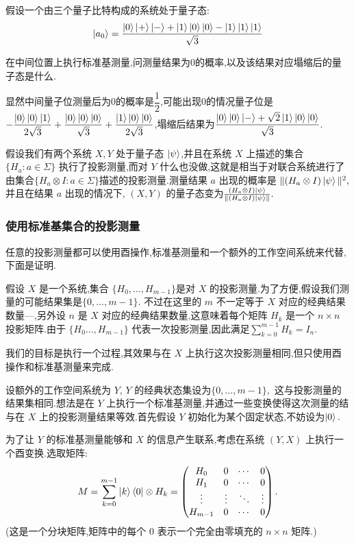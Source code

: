 \begin{example}
假设一个由三个量子比特构成的系统处于量子态:
$$
\ket{a_0}=\dfrac{\ket{0}\ket{+}\ket{-}+\ket{1}\ket{0}\ket{0}-\ket{1}\ket{1}\ket{1}}{\sqrt{3}}
$$

在中间位置上执行标准基测量,问测量结果为0的概率,以及该结果对应塌缩后的量子态是什么.

显然中间量子位测量后为0的概率是$\dfrac{1}{2}$,可能出现0的情况量子位是$-\dfrac{\ket{0}\ket{0}\ket{1}}{2\sqrt{3}}+\dfrac{\ket{0}\ket{0}\ket{0}}{\sqrt{3}}+\dfrac{\ket{1}\ket{0}\ket{0}}{2\sqrt{3}}$,塌缩后结果为$\dfrac{\ket{0}\ket{0}\ket{-}+\sqrt{2}\ket{1}\ket{0}\ket{0}}{\sqrt{3}}$.
\end{example}	
	
	
假设我们有两个系统 $X, Y$ 处于量子态 $\ket{\psi}$,并且在系统 $X$ 上描述的集合 $\{H_a : a \in \Sigma\}$ 执行了投影测量,而对 $Y$ 什么也没做,这就是相当于对联合系统进行了由集合$\{H_a \otimes I : a \in \Sigma\}$描述的投影测量.测量结果 $a$ 出现的概率是
$\|(H_a \otimes I) \ket{\psi}\|^2,$并且在结果 $a$ 出现的情况下, $(X, Y)$ 的量子态变为$\frac{(H_a \otimes I) \ket{\psi}}{\|(H_a \otimes I) \ket{\psi}\|}.$

\subsubsection{使用标准基集合的投影测量}

任意的投影测量都可以使用酉操作,标准基测量和一个额外的工作空间系统来代替,下面是证明.

假设 $X$ 是一个系统,集合
$\{H_0, \ldots, H_{m-1}\}$是对 $X$ 的投影测量.为了方便,假设我们测量的可能结果集是$\{0, \ldots, m-1\}.$ 不过在这里的 $m$ 不一定等于 $X$ 对应的经典结果数量—,另外设 $n$ 是 $X$ 对应的经典结果数量,这意味着每个矩阵 $H_k$ 是一个 $n \times n$ 投影矩阵.由于 $\{H_0 \ldots, H_{m-1}\}$ 代表一次投影测量,因此满足$\sum_{k = 0}^{m-1} H_k = I_n.$

我们的目标是执行一个过程,其效果与在 $X$ 上执行这次投影测量相同,但只使用酉操作和标准基测量来完成.

设额外的工作空间系统为 $Y$, $Y$ 的经典状态集设为$\{0, \ldots, m-1\},$
这与投影测量的结果集相同.想法是在 $Y$ 上执行一个标准基测量,并通过一些变换使得这次测量的结与在 $X$ 上的投影测量结果等效.首先假设 $Y$ 初始化为某个固定状态,不妨设为$\ket{0}.$

为了让 $Y$ 的标准基测量能够和 $X$ 的信息产生联系,考虑在系统 $(Y, X)$ 上执行一个酉变换.选取矩阵:
\begin{equation}
M = \sum_{k=0}^{m-1} \ket{k}\bra{0} \otimes H_k= \begin{pmatrix}
	H_0 & 0 & \cdots & 0 \\
	H_1 & 0 & \cdots & 0 \\
	\vdots & \vdots & \ddots & \vdots \\
	H_{m-1} & 0 & \cdots & 0
\end{pmatrix}.
\end{equation}
(这是一个分块矩阵,矩阵中的每个 $0$ 表示一个完全由零填充的 $n \times n$ 矩阵.)

